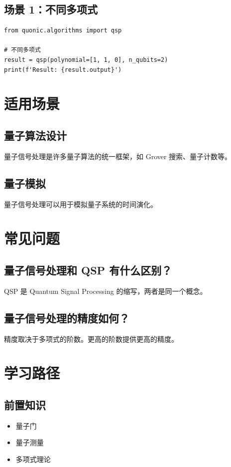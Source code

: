 \documentclass[12pt,a4paper]{article}
\begin{document}
\subsection{场景 1：不同多项式}

\begin{verbatim}
from quonic.algorithms import qsp

# 不同多项式
result = qsp(polynomial=[1, 1, 0], n_qubits=2)
print(f'Result: {result.output}')
\end{verbatim}

\section{适用场景}

\subsection{量子算法设计}

量子信号处理是许多量子算法的统一框架，如 Grover 搜索、量子计数等。

\subsection{量子模拟}

量子信号处理可以用于模拟量子系统的时间演化。

\section{常见问题}

\subsection{量子信号处理和 QSP 有什么区别？}

QSP 是 Quantum Signal Processing 的缩写，两者是同一个概念。

\subsection{量子信号处理的精度如何？}

精度取决于多项式的阶数。更高的阶数提供更高的精度。

\section{学习路径}

\subsection{前置知识}
\begin{itemize}
  \item 量子门
  \item 量子测量
  \item 多项式理论
\end{itemize}
\end{document}
